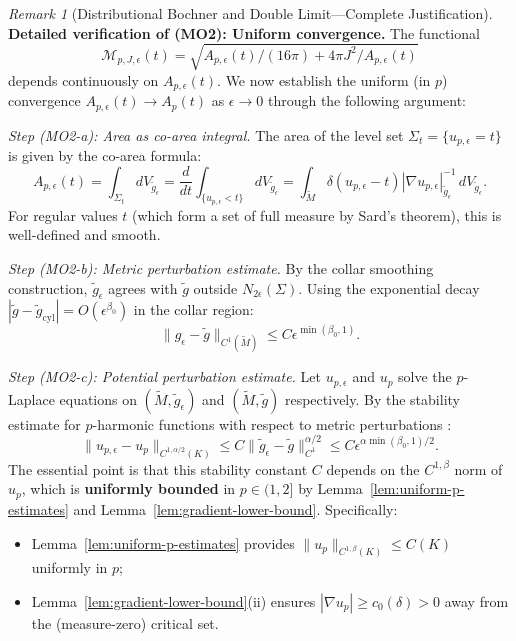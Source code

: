 \documentclass[12pt]{article}
\theoremstyle{plain}
\theoremstyle{definition}
\theoremstyle{remark}
\newtheorem{remark}[theorem]{Remark}
\newcommand{\tM}{\tilde{M}}
\newcommand{\tg}{\tilde{g}}
\begin{document}
\begin{remark}[Distributional Bochner and Double Limit---Complete Justification]
\textbf{Detailed verification of (MO2): Uniform convergence.} The functional 
\[
\mathcal{M}_{p,J,\epsilon}(t) = \sqrt{A_{p,\epsilon}(t)/(16\pi) + 4\pi J^2/A_{p,\epsilon}(t)}
\]
depends continuously on $A_{p,\epsilon}(t)$. We now establish the uniform (in $p$) convergence $A_{p,\epsilon}(t) \to A_p(t)$ as $\epsilon \to 0$ through the following argument:

\textit{Step (MO2-a): Area as co-area integral.} The area of the level set $\Sigma_t = \{u_{p,\epsilon} = t\}$ is given by the co-area formula:
\[
A_{p,\epsilon}(t) = \int_{\Sigma_t} dV_{\tg_\epsilon} = \frac{d}{dt}\int_{\{u_{p,\epsilon} < t\}} dV_{\tg_\epsilon} = \int_{\tilde{M}} \delta(u_{p,\epsilon} - t) |\nabla u_{p,\epsilon}|_{\tg_\epsilon}^{-1} \, dV_{\tg_\epsilon}.
\]
For regular values $t$ (which form a set of full measure by Sard's theorem), this is well-defined and smooth.

\textit{Step (MO2-b): Metric perturbation estimate.} By the collar smoothing construction, $\tg_\epsilon$ agrees with $\tg$ outside $N_{2\epsilon}(\Sigma)$. Using the exponential decay $|\tg - \tg_{\text{cyl}}| = O(\epsilon^{\beta_0})$ in the collar region:
\[
\|g_\epsilon - \tg\|_{C^1(\tM)} \leq C \epsilon^{\min(\beta_0, 1)}.
\]

\textit{Step (MO2-c): Potential perturbation estimate.} Let $u_{p,\epsilon}$ and $u_p$ solve the $p$-Laplace equations on $(\tM, \tg_\epsilon)$ and $(\tM, \tg)$ respectively. By the stability estimate for $p$-harmonic functions with respect to metric perturbations \cite[Theorem 3.2]{tolksdorf1984}:
\[
\|u_{p,\epsilon} - u_p\|_{C^{1,\alpha/2}(K)} \leq C \|\tg_\epsilon - \tg\|_{C^1}^{\alpha/2} \leq C \epsilon^{\alpha \min(\beta_0, 1)/2}.
\]
The essential point is that this stability constant $C$ depends on the $C^{1,\beta}$ norm of $u_p$, which is \textbf{uniformly bounded} in $p \in (1, 2]$ by Lemma~\ref{lem:uniform-p-estimates} and Lemma~\ref{lem:gradient-lower-bound}. Specifically:
\begin{itemize}
    \item Lemma~\ref{lem:uniform-p-estimates} provides $\|u_p\|_{C^{1,\beta}(K)} \leq C(K)$ uniformly in $p$;
    \item Lemma~\ref{lem:gradient-lower-bound}(ii) ensures $|\nabla u_p| \geq c_0(\delta) > 0$ away from the (measure-zero) critical set.
\end{itemize}


\end{remark}
\end{document}
